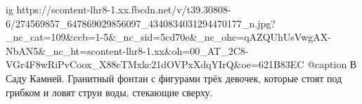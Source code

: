  
 
 
 
 

\ifcmt
  ig https://scontent-lhr8-1.xx.fbcdn.net/v/t39.30808-6/274569857_647869029856097_4340834031294470177_n.jpg?_nc_cat=109&ccb=1-5&_nc_sid=5cd70e&_nc_ohc=qAZQUhUsVwgAX-NbAN5&_nc_ht=scontent-lhr8-1.xx&oh=00_AT_2C8-VGr4F8wRiPvCoox_X88cTMxkc21dOVPxXdqYIrQ&oe=621B83EC
	@caption В Саду Камней. Гранитный фонтан с фигурами трёх девочек, которые стоят под грибком и ловят струи воды, стекающие сверху.
\fi
